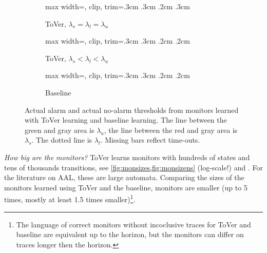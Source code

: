 \documentclass[runningheads]{llncs}
\newcommand{\lm}[2][]{\todo[color=cyan!50!white,#1]{\footnotesize{Luko: #2}}}
\renewcommand{\paragraph}[1]{\smallskip\noindent\emph{#1}}
\newcommand{\alg}{ToVer\xspace}
\begin{document}
\begin{figure}[t]
    \begin{subfigure}{.34\linewidth}
        \begin{adjustbox}{max width=\linewidth, clip, trim=.3cm .3cm .2cm .3cm}
            
        \end{adjustbox}
        \caption{\alg, $\lambda_s=\lambda_l=\lambda_u$}
        \label{fig:learnThrToverNS}
    \end{subfigure}\hfill
    \begin{subfigure}{.31\linewidth}
        \begin{adjustbox}{max width=\linewidth, clip, trim=.3cm .3cm .2cm .2cm}
            
        \end{adjustbox}
        \caption{\alg, $\lambda_s < \lambda_l < \lambda_u$}
        \label{fig:learnThrToverS}
    \end{subfigure}\hfill
    \begin{subfigure}{.31\linewidth}
        \begin{adjustbox}{max width=\linewidth, clip, trim=.3cm .3cm .2cm .2cm}
            
        \end{adjustbox}
        \caption{Baseline}
        \label{fig:learnThrSampling}
    \end{subfigure}
    \caption{Actual alarm and actual no-alarm thresholds from monitors learned with \alg learning and baseline learning. The line between the green and gray area is $\lambda_u$, the line between the red and gray area is $\lambda_s$. The dotted line is $\lambda_l$. Missing bars reflect time-outs.}
\end{figure}

\paragraph{How big are the monitors?}
\alg{} learns monitors with hundreds of states and tens of thousands transitions, see \cref{fig:monsizes,fig:monsizens} (log-scale!) and . For the literature on AAL, these are large automata\cite{yangImprovingModelInference2019,aichernigBenchmarkingCombinationsLearning2024,smeenkApplyingAutomataLearning2015}. Comparing the sizes of the monitors learned using \alg and the baseline, monitors are smaller (up to 5 times, mostly at least 1.5 times smaller)\footnote{The language of correct monitors without incoclusive traces for \alg and baseline are equivalent up to the horizon, but the monitors can differ on traces longer then the horizon.}.
\end{document}
